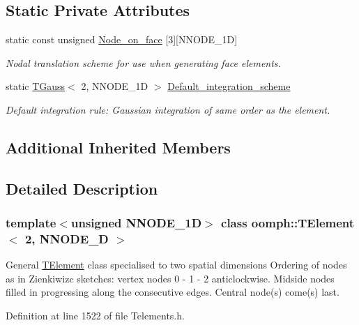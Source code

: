 \subsection*{Static Private Attributes}
\begin{DoxyCompactItemize}
\item 
static const unsigned \hyperlink{classoomph_1_1TElement_3_012_00_01NNODE__1D_01_4_a75b99450e2a11a5d6723f86defde1cc0}{Node\+\_\+on\+\_\+face} \mbox{[}3\mbox{]}\mbox{[}N\+N\+O\+D\+E\+\_\+1D\mbox{]}
\begin{DoxyCompactList}\small\item\em Nodal translation scheme for use when generating face elements. \end{DoxyCompactList}\item 
static \hyperlink{classoomph_1_1TGauss}{T\+Gauss}$<$ 2, N\+N\+O\+D\+E\+\_\+1D $>$ \hyperlink{classoomph_1_1TElement_3_012_00_01NNODE__1D_01_4_aa2eb2c7f5a5c0242bcc5cb270ee07b2d}{Default\+\_\+integration\+\_\+scheme}
\begin{DoxyCompactList}\small\item\em Default integration rule\+: Gaussian integration of same \textquotesingle{}order\textquotesingle{} as the element. \end{DoxyCompactList}\end{DoxyCompactItemize}
\subsection*{Additional Inherited Members}


\subsection{Detailed Description}
\subsubsection*{template$<$unsigned N\+N\+O\+D\+E\+\_\+1D$>$\newline
class oomph\+::\+T\+Element$<$ 2, N\+N\+O\+D\+E\+\_\+D $>$}

General \hyperlink{classoomph_1_1TElement}{T\+Element} class specialised to two spatial dimensions Ordering of nodes as in Zienkiwizc sketches\+: vertex nodes 0 -\/ 1 -\/ 2 anticlockwise. Midside nodes filled in progressing along the consecutive edges. Central node(s) come(s) last. 

Definition at line 1522 of file Telements.\+h.



